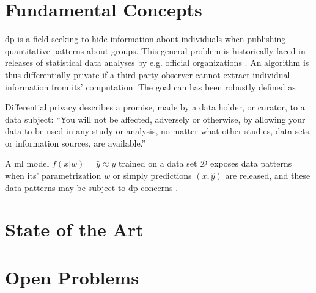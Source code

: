 \documentclass[12pt,fleqn,twocolumn]{article}
\begin{document}
\section*{Fundamental Concepts}%
\label{sec:Fundamental Concepts}
\acrfull{dp} is a field seeking to hide information about individuals when publishing quantitative patterns about groups.
This general problem is historically faced in releases of statistical data analyses by e.g. official organizations \cite{dalenius1977stat, wiki2022diff}.
An algorithm is thus differentially private if a third party observer cannot extract individual information from its' computation.
The goal can has been robustly defined \cite[pp. 5]{dwork2014alg} as
\begin{displayquote}
Differential privacy describes a promise, made by a data holder, or curator, to a data subject: “You will not be affected, adversely or otherwise, by allowing your data to be used in any study or analysis, no matter what other studies, data sets, or information sources, are available.”
\end{displayquote}
A \acrfull{ml} model \(f(x|w)=\hat y \approx y\) trained on a data set \(\mathcal D\) exposes data patterns when its' parametrization $w$ or simply predictions $(x, \hat y)$ are released, and these data patterns may be subject to \acrshort{dp} concerns \cite[Chap. 11]{dwork2014alg}.

\section*{State of the Art}%
\label{sec:State of The Art}

\section*{Open Problems}%
\label{sec:Open Problems}

\renewcommand*{\bibfont}{\normalfont\footnotesize}
\printbibliography[heading=bibintoc]

\printglossary[type=\acronymtype]
\end{document}
